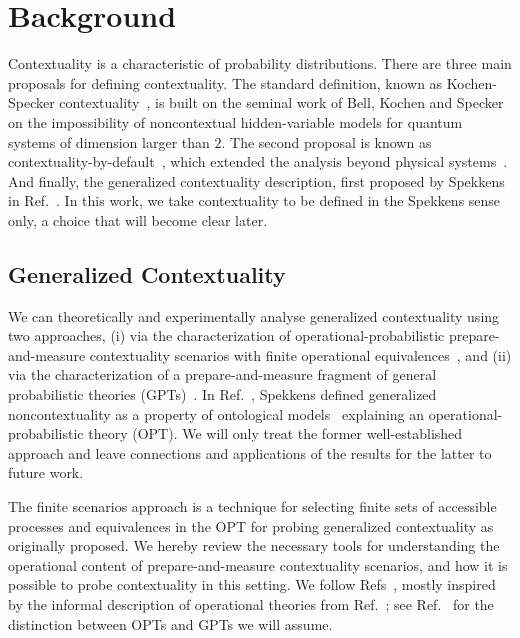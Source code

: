 \documentclass[a4paper,twocolumn,11pt,accepted=2024-01-17]{quantumarticle}
\begin{document}
\section{Background}

Contextuality is a  characteristic of probability distributions. There are three main proposals for defining contextuality. The standard definition, known as Kochen-Specker contextuality~\cite{Budroni21}, is built on the seminal work of Bell, Kochen and Specker~\cite{KochenS67,Bell64,Bell66} on the impossibility of noncontextual hidden-variable models for quantum systems of dimension larger than $2$. The second proposal is known as contextuality-by-default~\cite{dzhafarov2016contextuality,kujala2022contextuality,kujala2019measures}, which extended the analysis beyond physical systems~\cite{cervantes2018snow}. And finally, the generalized contextuality description, first proposed by Spekkens in Ref.~\cite{spekkens2005contextuality}. In this work, we take contextuality to be defined in the Spekkens sense only, a choice that will become clear later.

\subsection{Generalized Contextuality}\label{subsec: generalized contextuality}
We can theoretically and experimentally analyse generalized contextuality using two approaches, (i) via the characterization of operational-probabilistic prepare-and-measure contextuality scenarios with finite operational equivalences~\cite{schmid2018all,chaturvedi2021characterising,tavakoli2021bounding,schmid2018discrimination,Lostaglio2020contextualadvantage,kunjwal_anomalous_2019}, and (ii) via the characterization of a prepare-and-measure fragment of general probabilistic theories (GPTs)~\cite{schmid2021characterization,shahandeh2021contextuality,selby2021accessible,selby2022open}. In Ref.~\cite{spekkens2005contextuality}, Spekkens defined generalized noncontextuality as a property of ontological models~\cite{leifer2014isthequantum,liang2011specker} explaining an operational-probabilistic theory (OPT). We will only treat the former well-established approach and leave  connections and applications of the results for the latter to future work. 

The finite scenarios approach is a technique for selecting finite sets of accessible processes and equivalences in the OPT for probing generalized contextuality as originally proposed. We hereby review the necessary tools for understanding the operational content of prepare-and-measure contextuality scenarios, and how it is possible to probe contextuality in this setting. We follow Refs~\cite{schmid2018all,chaturvedi2021characterising,tavakoli2021bounding,schmid2018discrimination,Lostaglio2020contextualadvantage,lostaglio_certifying_2020,kunjwal2019beyondcabello,kunjwal_anomalous_2019}, mostly inspired by the informal description of operational theories from Ref.~\cite{spekkens2005contextuality}; see Ref.~\cite{schmid2020structure} for the distinction between OPTs and GPTs we will assume.
\end{document}
